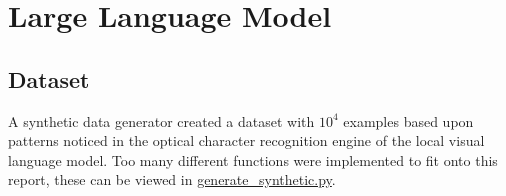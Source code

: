 \documentclass[a4paper,11pt]{report}
\begin{document}
            
    \chapter{Large Language Model}
    
        \section{Dataset}
            A synthetic data generator created a dataset with $10^{4}$ examples based upon patterns noticed in the optical character recognition engine of the local visual language model. Too many different functions were implemented to fit onto this report, these can be viewed in \href{https://github.com/lenamerkli/ingredient-scanner/blob/main/data/ingredients/generate_synthethic.py}{generate\_synthetic.py}.
    
\end{document}
